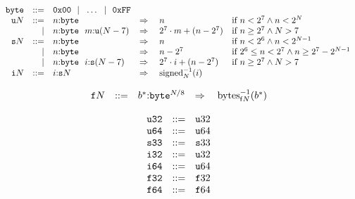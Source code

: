 \vspace{1ex}

$$
\begin{array}[t]{@{}lrrl@{}l@{}l@{}l@{}}
& {\mathtt{byte}} & ::= & \mathtt{0x00} ~~|~~ \ldots ~~|~~ \mathtt{0xFF} \\
& {{\mathtt{u}}}{N} & ::= & n{:}{\mathtt{byte}} & \quad\Rightarrow\quad{} & n & \quad \mbox{if}~ n < {2^{7}} \land n < {2^{N}} \\
& & | & n{:}{\mathtt{byte}}~~m{:}{{\mathtt{u}}}{(N - 7)} & \quad\Rightarrow\quad{} & {2^{7}} \cdot m + (n - {2^{7}}) & \quad \mbox{if}~ n \geq {2^{7}} \land N > 7 \\
& {{\mathtt{s}}}{N} & ::= & n{:}{\mathtt{byte}} & \quad\Rightarrow\quad{} & n & \quad \mbox{if}~ n < {2^{6}} \land n < {2^{N - 1}} \\
& & | & n{:}{\mathtt{byte}} & \quad\Rightarrow\quad{} & n - {2^{7}} & \quad \mbox{if}~ {2^{6}} \leq n < {2^{7}} \land n \geq {2^{7}} - {2^{N - 1}} \\
& & | & n{:}{\mathtt{byte}}~~i{:}{{\mathtt{s}}}{(N - 7)} & \quad\Rightarrow\quad{} & {2^{7}} \cdot i + (n - {2^{7}}) & \quad \mbox{if}~ n \geq {2^{7}} \land N > 7 \\
& {{\mathtt{i}}}{N} & ::= & i{:}{{\mathtt{s}}}{N} & \quad\Rightarrow\quad{} & {{{{\mathrm{signed}}}_{N}^{{-1}}}}{(i)} \\
\end{array}
$$

\vspace{1ex}

$$
\begin{array}[t]{@{}lrrl@{}l@{}l@{}l@{}}
& {{\mathtt{f}}}{N} & ::= & {b^\ast}{:}{{\mathtt{byte}}^{N / 8}} & \quad\Rightarrow\quad{} & {{{{\mathrm{bytes}}}_{{\mathsf{f}}{N}}^{{-1}}}}{({b^\ast})} \\
\end{array}
$$

\vspace{1ex}

$$
\begin{array}[t]{@{}lrrl@{}l@{}l@{}l@{}}
& {\mathtt{u32}} & ::= & {{\mathtt{u}}}{32} \\
& {\mathtt{u64}} & ::= & {{\mathtt{u}}}{64} \\
& {\mathtt{s33}} & ::= & {{\mathtt{s}}}{33} \\
& {\mathtt{i32}} & ::= & {{\mathtt{u}}}{32} \\
& {\mathtt{i64}} & ::= & {{\mathtt{u}}}{64} \\
& {\mathtt{f32}} & ::= & {{\mathtt{f}}}{32} \\
& {\mathtt{f64}} & ::= & {{\mathtt{f}}}{64} \\
\end{array}
$$

